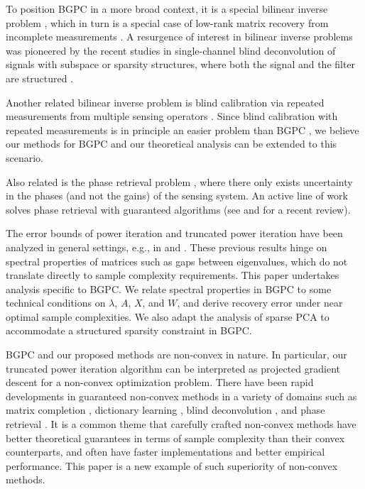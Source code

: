 \documentclass[11pt,journal]{IEEEtran}
\begin{document}
To position BGPC in a more broad context, it is a special bilinear inverse problem \cite{Li2015}, which in turn is a special case of low-rank matrix recovery from incomplete measurements \cite{Davenport2016,Li2016,Kech2016,Lee2013}. A resurgence of interest in bilinear inverse problems was pioneered by the recent studies in single-channel blind deconvolution of signals with subspace or sparsity structures, where both the signal and the filter are structured \cite{Ahmed2014,Ling2015,Chi2015,Lee2015a,XLi2016}. 

Another related bilinear inverse problem is blind calibration via repeated measurements from multiple sensing operators \cite{Bahmani2015a,Tang2014,Cambareri2016,Cambareri2017,Ahmed2016a,Cosse2017}. Since blind calibration with repeated measurements is in principle an easier problem than BGPC \cite{Ling2016}, we believe our methods for BGPC and our theoretical analysis can be extended to this scenario.

Also related is the phase retrieval problem \cite{Fienup1982}, where there only exists uncertainty in the phases (and not the gains) of the sensing system. An active line of work solves phase retrieval with guaranteed algorithms (see \cite{Candes2013a,Netrapalli2013,Candes2015,Cai2016,Bahmani2016,Goldstein2016} and \cite{Shechtman2015} for a recent review).


The error bounds of power iteration and truncated power iteration have been analyzed in general settings, e.g., in \cite[Section 8.2.1]{Golub1996} and \cite{Yuan2013}. These previous results hinge on spectral properties of matrices such as gaps between eigenvalues, which do not translate directly to sample complexity requirements. This paper undertakes analysis specific to BGPC. We relate spectral properties in BGPC to some technical conditions on $\lambda$, $A$, $X$, and $W$, and derive recovery error under near optimal sample complexities. We also adapt the analysis of sparse PCA \cite{Yuan2013} to accommodate a structured sparsity constraint in BGPC.

BGPC and our proposed methods are non-convex in nature. In particular, our truncated power iteration algorithm can be interpreted as projected gradient descent for a non-convex optimization problem. There have been rapid developments in guaranteed non-convex methods \cite{Sun2015} in a variety of domains such as matrix completion \cite{Keshavan2010,Jain2013,RSun2016}, dictionary learning \cite{Sun2017,Sun2017a}, blind deconvolution \cite{Lee2015a,XLi2016}, and phase retrieval \cite{Candes2015,Netrapalli2013,Sun2016}. It is a common theme that carefully crafted non-convex methods have better theoretical guarantees in terms of sample complexity than their convex counterparts, and often have faster implementations and better empirical performance. This paper is a new example of such superiority of non-convex methods.
\end{document}
